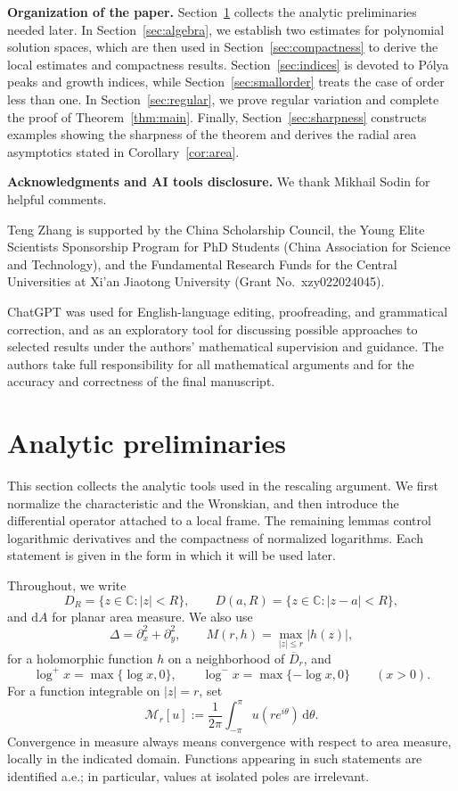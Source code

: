 \documentclass[12pt,letterpaper,reqno]{amsart}
\theoremstyle{definition}
\numberwithin{equation}{section}
\newcommand{\C}{\mathbb C}
\newcommand{\mean}[2]{\mathcal M_{#1}\!\left[#2\right]}
\begin{document}
\medskip
\noindent\textbf{Organization of the paper.}
Section~\ref{sec:analytic} collects the analytic preliminaries needed later.
In Section~\ref{sec:algebra}, we establish two estimates for polynomial
solution spaces, which are then used in Section~\ref{sec:compactness} to
derive the local estimates and compactness results. Section~\ref{sec:indices}
is devoted to P\'olya peaks and growth indices, while
Section~\ref{sec:smallorder} treats the case of order less than one.
In Section~\ref{sec:regular}, we prove regular variation and complete the
proof of Theorem~\ref{thm:main}. Finally, Section~\ref{sec:sharpness}
constructs examples showing the sharpness of the theorem and derives the
radial area asymptotics stated in Corollary~\ref{cor:area}.


\medskip
\noindent\textbf{Acknowledgments and AI tools disclosure.}
We thank Mikhail Sodin for helpful comments.

Teng Zhang is supported by the China Scholarship Council, the Young Elite
Scientists Sponsorship Program for PhD Students (China Association for Science
and Technology), and the Fundamental Research Funds for the Central
Universities at Xi'an Jiaotong University (Grant No.~xzy022024045).

ChatGPT was used for English-language editing, proofreading, and grammatical
correction, and as an exploratory tool for discussing possible approaches to
selected results under the authors' mathematical supervision and guidance.
The authors take full responsibility for all mathematical arguments and for
the accuracy and correctness of the final manuscript.


\section{Analytic preliminaries}\label{sec:analytic}

This section collects the analytic tools used in the rescaling argument. We
first normalize the characteristic and the Wronskian, and then introduce the
differential operator attached to a local frame. The remaining lemmas control
logarithmic derivatives and the compactness of normalized logarithms. Each
statement is given in the form in which it will be used later.

Throughout, we write
\[
D_R=\{z\in\C:|z|<R\},\qquad
D(a,R)=\{z\in\C:|z-a|<R\},
\]
and \(\mathrm dA\) for planar area measure. We also use
\[
\Delta=\partial_x^2+\partial_y^2,\qquad
M(r,h)=\max_{|z|\le r}|h(z)|,
\]
for a holomorphic function \(h\) on a neighborhood of \(\overline D_r\), and
\[
\log^+x=\max\{\log x,0\},\qquad
\log^-x=\max\{-\log x,0\}\qquad(x>0).
\]
For a function integrable on \(|z|=r\), set
\[
\mean r u:=\frac1{2\pi}\int_{-\pi}^{\pi}u(re^{i\theta})\,\mathrm d\theta.
\]
Convergence in measure always means convergence with respect to area measure,
locally in the indicated domain. Functions appearing in such statements are
identified a.e.; in particular, values at isolated poles are irrelevant.
\end{document}
